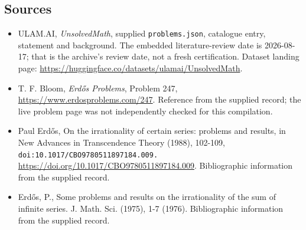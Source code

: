 \documentclass[11pt,a4paper]{article}
\begin{document}
\subsection{Sources}

{\small

\begin{itemize}

\item[\hypertarget{source:statement:1}{S1}] ULAM.AI, \emph{UnsolvedMath}, supplied \texttt{problems.json}, catalogue entry, statement and background. The embedded literature-review date is 2026-08-17; that is the archive’s review date, not a fresh certification. Dataset landing page: \url{https://huggingface.co/datasets/ulamai/UnsolvedMath}.

\item[\hypertarget{source:statement:2}{S2}] T. F. Bloom, \emph{Erdős Problems}, Problem 247, \url{https://www.erdosproblems.com/247}. Reference from the supplied record; the live problem page was not independently checked for this compilation.

\item[\hypertarget{source:statement:3}{S3}] Paul Erdős, On the irrationality of certain series: problems and results, in New Advances in Transcendence Theory (1988), 102-109, \nolinkurl{doi:10.1017/CBO9780511897184.009.} \url{https://doi.org/10.1017/CBO9780511897184.009}. Bibliographic information from the supplied record.

\item[\hypertarget{source:statement:4}{S4}] Erd\H{o}s, P., Some problems and results on the irrationality of the sum of infinite series. J. Math. Sci. (1975), 1-7 (1976). Bibliographic information from the supplied record.

\end{itemize}

}

\label{end:statement}
\end{document}
